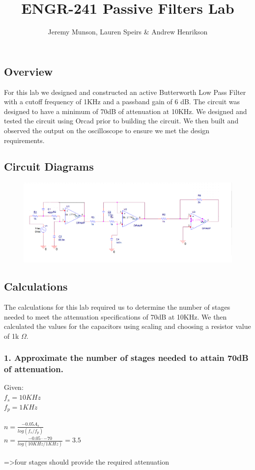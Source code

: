 \documentclass[11pt]{article}
\title{ENGR-241 Passive Filters Lab}
\author{Jeremy Munson, Lauren Speirs \& Andrew Henrikson}
\begin{document}
	\maketitle
	\subsection*{Overview}
	For this lab we designed and  constructed an active Butterworth Low Pass Filter with a cutoff frequency of 1KHz and a passband gain of 6 dB. The circuit was designed to have a minimum of 70dB of attenuation at 10KHz. We designed and tested the circuit using Orcad prior to building the circuit. We then built and observed the output on the oscilloscope to ensure we met the design requirements.
	\subsection*{Circuit Diagrams}
		\begin{figure}[H]
		\centering
		\includegraphics[width=5.5in]{images/diagram.PNG}
	\end{figure}
	\subsection*{Calculations}
	The calculations for this lab required us to determine the number of stages needed to meet the attenuation specifications of 70dB at 10KHz. We then calculated the values for the capacitors using scaling and choosing a resistor value of 1k $\Omega$.
	\subsubsection*{1. Approximate the number of stages needed to attain 70dB of attenuation.}
	Given:\\
	$f_{s}=10KHz$\\
	$f_{p}=1KHz$\\\\
	$n=\frac{-0.05A_{s}}{log(f_{s}/f_{p})}$\\
	$n=\frac{-0.05\cdot -70}{log(10KHz/1KHz)}=3.5$\\\\
	=>four stages should provide the required attenuation
\end{document}
